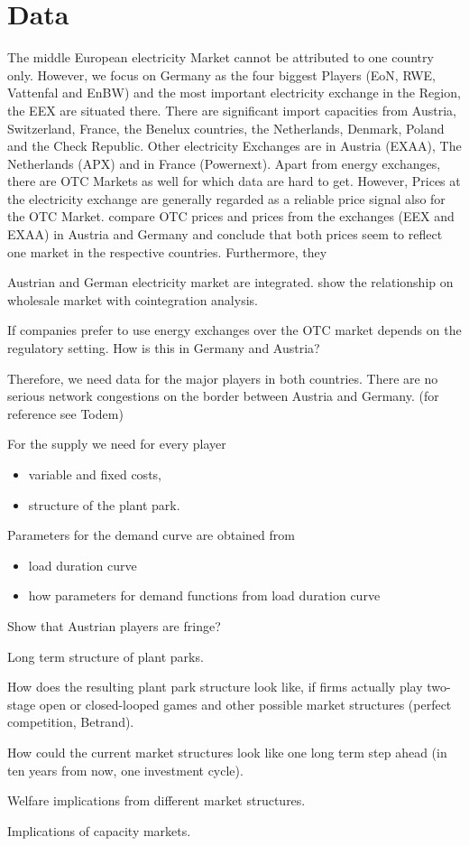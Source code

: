 \section{Data}

The middle European electricity Market cannot be attributed to one country only. However, we focus on Germany as the four biggest Players (EoN, RWE, Vattenfal and EnBW) and the most important electricity exchange in the Region, the EEX are situated there. There are significant import capacities from Austria, Switzerland, France, the Benelux countries, the Netherlands, Denmark, Poland and the Check Republic. Other electricity Exchanges are in Austria (EXAA), The Netherlands (APX) and in France (Powernext). Apart from energy exchanges, there are OTC Markets as well for which data are hard to get. However, Prices at the electricity exchange are generally regarded as a reliable price signal also for the OTC Market. \cite{Holler2006} compare OTC prices and prices from the exchanges (EEX and EXAA) in Austria and Germany and conclude that both prices seem to reflect one market in the respective countries. Furthermore, they  

Austrian and German electricity market are integrated. \cite{Holler2006} show the relationship on wholesale market with cointegration analysis.

If companies prefer to use energy exchanges over the OTC market depends on the regulatory setting. How is this in Germany and Austria?

Therefore, we need data for the major players in both countries. There are no serious network congestions on the border between Austria and Germany. (for reference see Todem)

For the supply we need for every player

\begin{itemize}
\item variable and fixed costs,
\item structure of the plant park.
\end{itemize}

Parameters for the demand curve are obtained from

\begin{itemize}
\item load duration curve
\item how parameters for demand functions from load duration curve
\end{itemize}

Show that Austrian players are fringe? 

Long term structure of plant parks.

How does the resulting plant park structure look like, if firms actually play two-stage open or closed-looped games and other possible market structures (perfect competition, Betrand). 

How could the current market structures look like one long term step ahead (in ten years from now, one investment cycle).

Welfare implications from different market structures.

Implications of capacity markets.

